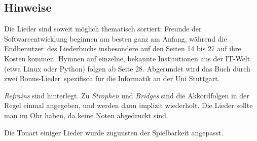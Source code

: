 \documentclass[11pt,a5paper]{article}
\begin{document}
\subsection*{Hinweise}

Die Lieder sind soweit möglich thematisch sortiert; Freunde der Softwareentwicklung beginnen am besten ganz am Anfang, während die \glqq Endbenutzer\grqq \ des Liederbuchs insbesondere auf den Seiten 14 bis 27 auf ihre Kosten kommen. Hymnen auf einzelne, bekannte Institutionen aus der IT-Welt (etwa Linux oder Python) folgen ab Seite 28. Abgerundet wird das Buch durch zwei \glqq Bonus-Lieder\grqq \ spezifisch für die Informatik an der Uni Stuttgart.

\emph{Refrains} sind hinterlegt.
Zu \emph{Strophen} und \emph{Bridges} sind die Akkordfolgen in der Regel einmal angegeben, und werden dann implizit wiederholt. Die Lieder sollte man im Ohr haben, da keine Noten abgedruckt sind.

Die Tonart einiger Lieder wurde zugunsten der Spielbarkeit angepasst.

\pagebreak







































\end{document}
